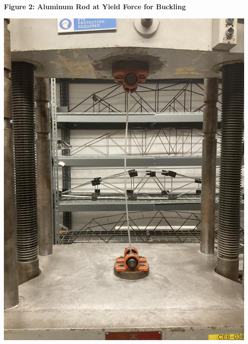 \documentclass{article}
\begin{document}
    \begin{center}
        {\bf Figure 2: Aluminum Rod at Yield Force for Buckling}
        \vspace{3mm}
        \includegraphics[scale=0.7]{pic2.png}
    \end{center}
    \newpage
\end{document}
